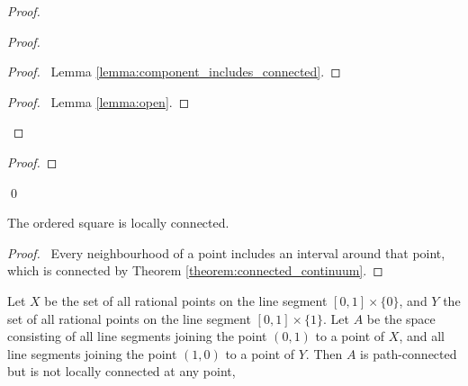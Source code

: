 \begin{proof}
    \pf
    \begin{proof}
        \begin{proof}
            \pf\ Lemma \ref{lemma:component_includes_connected}.
        \end{proof}
        \qedstep
        \begin{proof}
            \pf\ Lemma \ref{lemma:open}.
        \end{proof}
    \end{proof}
    \begin{proof}
    \end{proof}
    \qed
\end{proof}

\begin{example}
    The ordered square is locally connected.
\end{example}

\begin{proof}
    \pf\ Every neighbourhood of a point includes an interval around that point, which is connected 
    by Theorem \ref{theorem:connected_continuum}.
\end{proof}

\begin{example}
    Let $X$ be the set of all rational points on the line segment $[0,1] \times \{0\}$,
    and $Y$ the set of all rational points on the line segment $[0,1] \times \{1\}$.
    Let $A$ be the space consisting of all line segments joining the point $(0,1)$ to a point
    of $X$, and all line segments joining the point $(1,0)$ to a point of $Y$. Then $A$ is
    path-connected but is not locally connected at any point,
\end{example}

